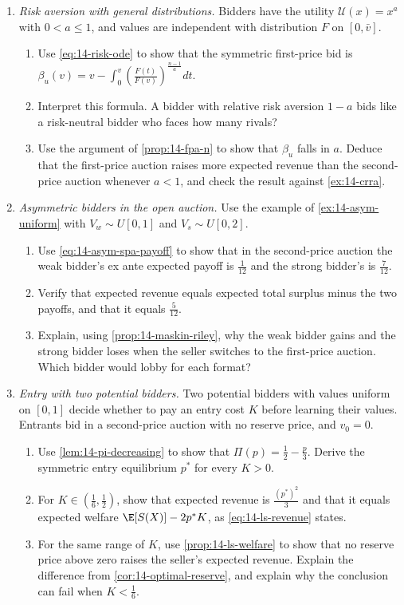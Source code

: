 \begin{enumerate}[label=\arabic*., leftmargin=*, itemsep=6pt]
\item \textit{Risk aversion with general distributions.} Bidders have the utility $\mathcal{U}(x)=x^a$ with
$0<a\le 1$, and values are independent with distribution $F$ on $[0,\bar v]$.
\begin{enumerate}[label=(\alph*)]
  \item Use \eqref{eq:14-risk-ode} to show that the symmetric first-price bid is
  $\beta_u(v)=v-\int_0^v\left(\frac{F(t)}{F(v)}\right)^{\frac{n-1}{a}}dt$.
  \item Interpret this formula. A bidder with relative risk aversion $1-a$ bids like a risk-neutral bidder who
  faces how many rivals?
  \item Use the argument of \cref{prop:14-fpa-n} to show that $\beta_u$ falls in $a$. Deduce that the first-price
  auction raises more expected revenue than the second-price auction whenever $a<1$, and check the result
  against \cref{ex:14-crra}.
\end{enumerate}

\item \textit{Asymmetric bidders in the open auction.} Use the example of \cref{ex:14-asym-uniform} with
$V_w\sim U[0,1]$ and $V_s\sim U[0,2]$.
\begin{enumerate}[label=(\alph*)]
  \item Use \eqref{eq:14-asym-spa-payoff} to show that in the second-price auction the weak bidder's ex ante
  expected payoff is $\frac{1}{12}$ and the strong bidder's is $\frac{7}{12}$.
  \item Verify that expected revenue equals expected total surplus minus the two payoffs, and that it equals
  $\frac{5}{12}$.
  \item Explain, using \cref{prop:14-maskin-riley}, why the weak bidder gains and the strong bidder loses when
  the seller switches to the first-price auction. Which bidder would lobby for each format?
\end{enumerate}

\item \textit{Entry with two potential bidders.} Two potential bidders with values uniform on $[0,1]$ decide
whether to pay an entry cost $K$ before learning their values. Entrants bid in a second-price auction with no
reserve price, and $v_0=0$.
\begin{enumerate}[label=(\alph*)]
  \item Use \cref{lem:14-pi-decreasing} to show that $\Pi(p)=\frac{1}{2}-\frac{p}{3}$. Derive the symmetric
  entry equilibrium $p^*$ for every $K>0$.
  \item For $K\in\left(\frac{1}{6},\frac{1}{2}\right)$, show that expected revenue is $\frac{(p^*)^2}{3}$ and that
  it equals expected welfare $\E[S(X)]-2p^*K$, as \eqref{eq:14-ls-revenue} states.
  \item For the same range of $K$, use \cref{prop:14-ls-welfare} to show that no reserve price above zero raises
  the seller's expected revenue. Explain the difference from \cref{cor:14-optimal-reserve}, and explain why the
  conclusion can fail when $K<\frac{1}{6}$.
\end{enumerate}


\end{enumerate}
